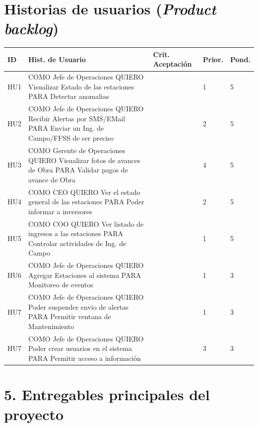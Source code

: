 \documentclass[11pt]{charter}
\begin{document}
\section{Historias de usuarios (\textit{Product backlog})}
\label{sec:backlog}

\begin{consigna} 
\begin{table}
\begin{tabularx}{\linewidth}{@{}|l|X|X|l|l|@{}}
\hline
\rowcolor[HTML]{C0C0C0} 
ID  & Hist. de Usuario & Crit. Aceptación & Prior. & Pond. \\ \hline
HU1 & COMO Jefe de Operaciones 
QUIERO Visualizar Estado de las estaciones 
PARA Detectar anomalias      & 	 & 1   & 5 	\\ \hline
HU2 & COMO Jefe de Operaciones 
QUIERO Recibir Alertas por SMS/EMail 
PARA Enviar un Ing. de Campo/FFSS de ser preciso   & 	& 2     & 5 	\\ \hline
HU3 & COMO Gerente de Operaciones 
QUIERO Visualizar fotos de avances de Obra 
PARA Validar pagos de avance de Obra  & 	&  4  & 5   	\\ \hline
HU4 & COMO CEO 
QUIERO Ver el estado general de las estaciones  
PARA Poder informar a inversores       & &  2 & 5	\\ \hline
HU5 & COMO COO 
QUIERO Ver listado de ingresos a las estaciones 
PARA Controlar actividades de Ing. de Campo &           	&   1  & 5  	\\ \hline
HU6 & COMO Jefe de Operaciones 
QUIERO Agregar Estaciones al sistema 
PARA Monitoreo de eventos  &  	& 1  & 3 \\ \hline
HU7 & COMO Jefe de Operaciones 
QUIERO Poder suspender envio de alertas 
PARA Permitir ventana de Mantenimiento  &   &  1 &  3	\\ \hline
HU7 & COMO Jefe de Operaciones 
QUIERO Poder crear usuarios en el sistema 
PARA Permitir acceso a información  &   &  3 &  3	\\ \hline

\end{tabularx}
\end{table}

\end{consigna}

\section{5. Entregables principales del proyecto}
\label{sec:entregables}
\end{document}
